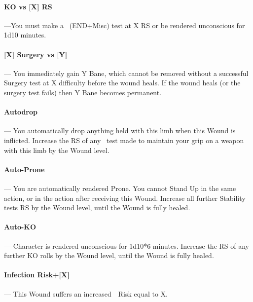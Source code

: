 \documentclass[oneside,11pt,english]{book}
\begin{document}
\vspace{-5pt}\paragraph[KO vs. ]{KO vs [X] RS }\label{par:KO vs}
---\quad You must make a ~(END+Misc) test at X RS or be rendered unconscious for 1d10 minutes.

\vspace{-5pt}\paragraph[Surgery vs. ]{\label{par:Surgery vs}[X] Surgery vs [Y]}---\quad
You immediately gain Y Bane, which cannot be removed without a successful Surgery test at X difficulty before the wound heals. If the wound heals (or the surgery test fails) then Y Bane becomes permanent.

\vspace{-5pt}\paragraph{\label{par:Autodrop}Autodrop}---\quad 
You automatically drop anything held with this limb when this Wound is inflicted. Increase the RS of any ~test made to maintain your grip on a weapon with this limb by the Wound level. %

\vspace{-5pt}\paragraph{\label{par:Auto-Prone}Auto-Prone}---\quad
You are automatically rendered Prone. You cannot Stand Up in the same action, or in the action after receiving this Wound. Increase all further Stability tests RS by the Wound level, until the Wound is fully healed.

\vspace{-5pt}\paragraph{\label{par:Auto-KO}Auto-KO}---\quad
Character is rendered unconscious for 1d10*6 minutes. Increase the RS of any further KO rolls by the Wound level, until the Wound is fully healed.

\vspace{-5pt}\paragraph[Infection Risk]{\label{par:Infection Risk}Infection Risk+[X]}---\quad
This Wound suffers an increased~~Risk equal to X.
\end{document}
